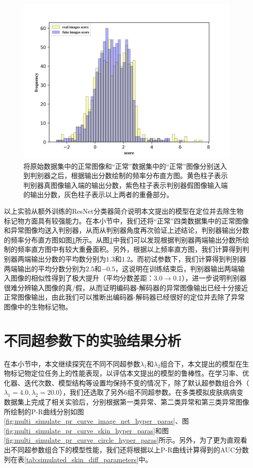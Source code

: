 \begin{figure}[h]
	\centering
	\includegraphics[width=1.0\textwidth]{figure/simulated_skin_score_distribution.png}
	\caption{将原始数据集中的正常图像和“正常”数据集中的“正常”图像分别送入到判别器之后，根据输出分数绘制的频率分布直方图。黄色柱子表示判别器真图像输入端的输出分数，紫色柱子表示判别器假图像输入端的输出分数，灰色柱子表示以上两者的重叠部分。}
	\label{fig:simulated_skin_hist_freq}
\end{figure}

以上实验从额外训练的ResNet分类器简介说明本文提出的模型在定位并去除生物标记物方面具有较强能力。在本小节中，我们还将“正常”四类数据集中的正常图像和异常图像均送入判别器，从而从判别器角度再次验证上述结论，判别器输出分数的频率分布直方图如图\ref{fig:simulated_skin_hist_freq}所示。从图\ref{fig:simulated_skin_hist_freq}中我们可以发现根据判别器两端输出分数所绘制的频率直方图中有较大重叠面积。另外，根据以上频率直方图，我们计算得到判别器两端输出分数的平均数分别为$1.3 $和$1.2$。而初试参数下，我们计算得到判别器两端输出的平均分数分别为$2.5$和$-0.5$，这说明在训练结束后，判别器输出两端输入图像的相似性得到了极大提升（平均分数差距：$3.0\rightarrow 0.1$），进一步说明判别器很难分辨输入图像的真/假，从而证明编码器-解码器的异常图像输出已经十分接近正常图像输出，由此我们可以推断出编码器-解码器已经很好的定位并去除了异常图像中的生物标记物。

\section{不同超参数下的实验结果分析}\label{sec:multi_classes_hyper_paras}
在本小节中，本文继续探究在不同不同超参数$\lambda_{1}$和$\lambda_{2}$组合下，本文提出的模型在生物标记物定位任务上的性能表现，以评估本文提出的模型的鲁棒性。在学习率、优化器、迭代次数、模型结构等设置均保持不变的情况下，除了默认超参数组合外（$\lambda_{1}=4.0,\lambda_{2}=20.0$），我们还选取了另外$6$组不同超参数。在多类模拟皮肤病病变数据集上完成了相关实验后，分别根据第一类异常、第二类异常和第三类异常图像所绘制的P-R曲线分别如图\ref{fig:multi_simulate_pr_curve_image_net_hyper_paras}、图\ref{fig:multi_simulate_pr_curve_skin_hyper_paras}和图\ref{fig:multi_simulate_pr_curve_circle_hyper_paras}所示。另外，为了更为直观看出不同超参数组合下的模型性能，我们还将根据以上P-R曲线计算得到的AUC分数列在表\ref{tab:simulated_skin_diff_parameters}中。

